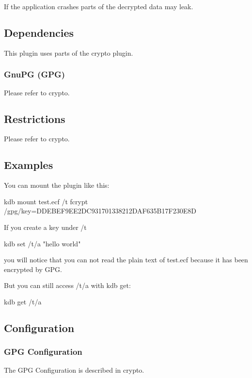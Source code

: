 If the application crashes parts of the decrypted data may leak.

\subsection*{Dependencies}

This plugin uses parts of the {\ttfamily crypto} plugin.

\subsubsection*{Gnu\+P\+G (G\+P\+G)}

Please refer to crypto.

\subsection*{Restrictions}

Please refer to crypto.

\subsection*{Examples}

You can mount the plugin like this\+: \begin{DoxyVerb}    kdb mount test.ecf /t fcrypt /gpg/key=DDEBEF9EE2DC931701338212DAF635B17F230E8D
\end{DoxyVerb}


If you create a key under {\ttfamily /t} \begin{DoxyVerb}    kdb set /t/a "hello world"
\end{DoxyVerb}


you will notice that you can not read the plain text of {\ttfamily test.\+ecf} because it has been encrypted by G\+P\+G.

But you can still access {\ttfamily /t/a} with {\ttfamily kdb get}\+: \begin{DoxyVerb}    kdb get /t/a
\end{DoxyVerb}


\subsection*{Configuration}

\subsubsection*{G\+P\+G Configuration}

The G\+P\+G Configuration is described in crypto. 